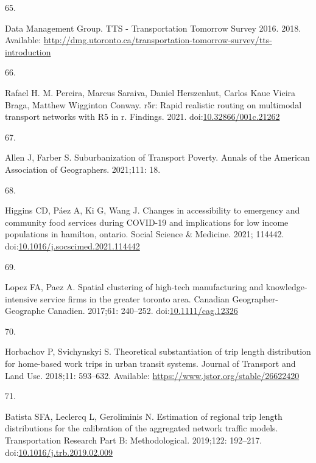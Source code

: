 \documentclass[10pt,letterpaper]{article}
\newlength{\cslhangindent}
\newlength{\csllabelwidth}
\newlength{\cslentryspacingunit} %
\newenvironment{CSLReferences}[2] %
 {%
  \setlength{\parindent}{0pt}
  \ifodd #1
  \let\oldpar\par
  \def\par{\hangindent=\cslhangindent\oldpar}
  \fi
  \setlength{\parskip}{#2\cslentryspacingunit}
 }%
 {}
\newcommand{\CSLLeftMargin}[1]{\parbox[t]{\csllabelwidth}{#1}}
\newcommand{\CSLRightInline}[1]{\parbox[t]{\linewidth - \csllabelwidth}{#1}\break}
\begin{document}
\begin{CSLReferences}{0}{0}
\leavevmode{}%
\CSLLeftMargin{65. }%
\CSLRightInline{Data Management Group. {TTS} - {Transportation}
{Tomorrow} {Survey} 2016. 2018. Available:
\url{http://dmg.utoronto.ca/transportation-tomorrow-survey/tts-introduction}}

\leavevmode{}%
\CSLLeftMargin{66. }%
\CSLRightInline{Rafael H. M. Pereira, Marcus Saraiva, Daniel Herszenhut,
Carlos Kaue Vieira Braga, Matthew Wigginton Conway. r5r: Rapid realistic
routing on multimodal transport networks with R5 in r. Findings. 2021.
doi:\href{https://doi.org/10.32866/001c.21262}{10.32866/001c.21262}}

\leavevmode{}%
\CSLLeftMargin{67. }%
\CSLRightInline{Allen J, Farber S. Suburbanization of {Transport}
{Poverty}. Annals of the American Association of Geographers. 2021;111:
18. }

\leavevmode{}%
\CSLLeftMargin{68. }%
\CSLRightInline{Higgins CD, Páez A, Ki G, Wang J. Changes in
accessibility to emergency and community food services during COVID-19
and implications for low income populations in hamilton, ontario. Social
Science \& Medicine. 2021; 114442.
doi:\href{https://doi.org/10.1016/j.socscimed.2021.114442}{10.1016/j.socscimed.2021.114442}}

\leavevmode{}%
\CSLLeftMargin{69. }%
\CSLRightInline{Lopez FA, Paez A. Spatial clustering of high-tech
manufacturing and knowledge-intensive service firms in the greater
toronto area. Canadian Geographer-Geographe Canadien. 2017;61: 240--252.
doi:\href{https://doi.org/10.1111/cag.12326}{10.1111/cag.12326}}

\leavevmode{}%
\CSLLeftMargin{70. }%
\CSLRightInline{Horbachov P, Svichynskyi S. Theoretical substantiation
of trip length distribution for home-based work trips in urban transit
systems. Journal of Transport and Land Use. 2018;11: 593--632.
Available: \url{https://www.jstor.org/stable/26622420}}

\leavevmode{}%
\CSLLeftMargin{71. }%
\CSLRightInline{Batista SFA, Leclercq L, Geroliminis N. Estimation of
regional trip length distributions for the calibration of the aggregated
network traffic models. Transportation Research Part B: Methodological.
2019;122: 192--217.
doi:\href{https://doi.org/10.1016/j.trb.2019.02.009}{10.1016/j.trb.2019.02.009}}


\end{CSLReferences}
\end{document}
